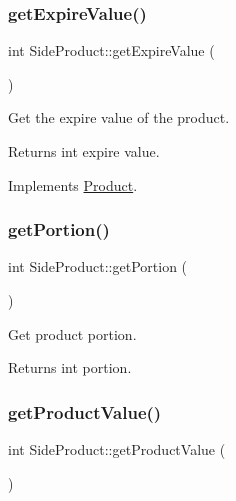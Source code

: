 \subsubsection{\texorpdfstring{get\+Expire\+Value()}{getExpireValue()}}
{\footnotesize\ttfamily int Side\+Product\+::get\+Expire\+Value (\begin{DoxyParamCaption}{ }\end{DoxyParamCaption})\hspace{0.3cm}{\ttfamily [virtual]}}

Get the expire value of the product. \begin{DoxyReturn}{Returns}
int expire value. 
\end{DoxyReturn}


Implements \hyperlink{classProduct_a739031c520fb9e376da3d3fc2955c7e7}{Product}.

\mbox{\label{classSideProduct_a8265dbcfcde3880817bfb8d82e563700}} 
\subsubsection{\texorpdfstring{get\+Portion()}{getPortion()}}
{\footnotesize\ttfamily int Side\+Product\+::get\+Portion (\begin{DoxyParamCaption}{ }\end{DoxyParamCaption})}

Get product portion. \begin{DoxyReturn}{Returns}
int portion. 
\end{DoxyReturn}
\mbox{\label{classSideProduct_ae37e75482c8ddaf7abe070054fad58eb}} 
\subsubsection{\texorpdfstring{get\+Product\+Value()}{getProductValue()}}
{\footnotesize\ttfamily int Side\+Product\+::get\+Product\+Value (\begin{DoxyParamCaption}{ }\end{DoxyParamCaption})\hspace{0.3cm}{\ttfamily [virtual]}}

